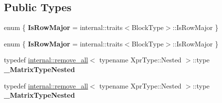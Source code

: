 \subsection*{Public Types}
\begin{DoxyCompactItemize}
\item 
\mbox{\label{class_eigen_1_1_block_impl_3_01_xpr_type_00_01_block_rows_00_01_block_cols_00_01_inner_panel_00_01_sparse_01_4_a2d07dac28594c7149a13f0d085033bbf}} 
enum \{ {\bfseries Is\+Row\+Major} = internal\+:\+:traits$<$Block\+Type$>$\+:\+:Is\+Row\+Major
 \}
\item 
\mbox{\label{class_eigen_1_1_block_impl_3_01_xpr_type_00_01_block_rows_00_01_block_cols_00_01_inner_panel_00_01_sparse_01_4_a1ca781bde6ec7c22d99b123b980ce29f}} 
enum \{ {\bfseries Is\+Row\+Major} = internal\+:\+:traits$<$Block\+Type$>$\+:\+:Is\+Row\+Major
 \}
\item 
\mbox{\label{class_eigen_1_1_block_impl_3_01_xpr_type_00_01_block_rows_00_01_block_cols_00_01_inner_panel_00_01_sparse_01_4_acc94ba0d1f7f531a08624d7725bb6aca}} 
typedef \hyperlink{struct_eigen_1_1internal_1_1remove__all}{internal\+::remove\+\_\+all}$<$ typename Xpr\+Type\+::\+Nested $>$\+::type {\bfseries \+\_\+\+Matrix\+Type\+Nested}
\item 
\mbox{\label{class_eigen_1_1_block_impl_3_01_xpr_type_00_01_block_rows_00_01_block_cols_00_01_inner_panel_00_01_sparse_01_4_acc94ba0d1f7f531a08624d7725bb6aca}} 
typedef \hyperlink{struct_eigen_1_1internal_1_1remove__all}{internal\+::remove\+\_\+all}$<$ typename Xpr\+Type\+::\+Nested $>$\+::type {\bfseries \+\_\+\+Matrix\+Type\+Nested}
\end{DoxyCompactItemize}
